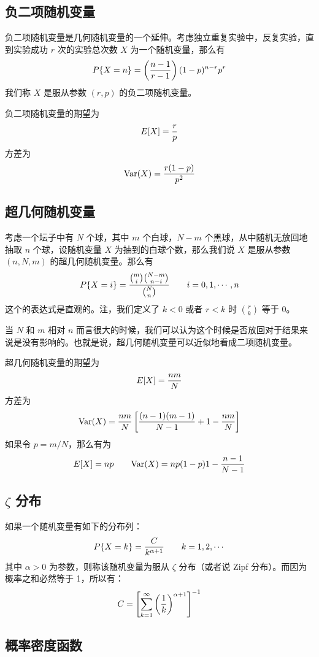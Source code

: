 \documentclass[utf8,a4paper,nofonts,9pt]{ctexbook}
\begin{document}
\subsection{负二项随机变量}

负二项随机变量是几何随机变量的一个延伸。考虑独立重复实验中，反复实验，直到实验成功 $r$ 次的实验总次数 $X$ 为一个随机变量，那么有
\[
    P\{ X = n \} = \left( { n - 1 \over r - 1 } \right) (1 - p)^{n - r} p^r
\]
我们称 $X$ 是服从参数 $(r, p)$ 的负二项随机变量。

负二项随机变量的期望为
\[
    E[X] = {r \over p}
\]
方差为
\[
    \textrm{Var}(X) = {r(1 - p) \over p^2}
\]


\subsection{超几何随机变量}

考虑一个坛子中有 $N$ 个球，其中 $m$ 个白球，$N - m$ 个黑球，从中随机无放回地抽取 $n$ 个球，设随机变量 $X$ 为抽到的白球个数，那么我们说 $X$ 是服从参数 $(n, N, m)$ 的超几何随机变量。那么有
\[
    P\{ X = i \} = {{m \choose i} {N - m \choose n - i} \over {N \choose n}} \qquad i = 0, 1, \cdots, n
\]
这个的表达式是直观的。注，我们定义了 $k < 0$ 或者 $r < k$ 时 $r \choose k$ 等于 $0$。

当 $N$ 和 $m$ 相对 $n$ 而言很大的时候，我们可以认为这个时候是否放回对于结果来说是没有影响的。也就是说，超几何随机变量可以近似地看成二项随机变量。

超几何随机变量的期望为
\[
    E[X] = {nm \over N}
\]
方差为
\[
    \textrm{Var}(X) = {nm \over N}\left[ {(n - 1)(m - 1) \over N - 1} + 1 - {nm \over N} \right]
\]
如果令 $p = m / N$，那么有为
\[
    E[X] = np \qquad \textrm{Var}(X) = np(1 - p){1- {n - 1 \over N - 1}}
\]


\subsection{$\zeta$ 分布}

如果一个随机变量有如下的分布列：
\[
    P\{X = k\} = {C \over k^{\alpha + 1}} \qquad k = 1, 2, \cdots
\]
其中 $\alpha > 0$ 为参数，则称该随机变量为服从 $\zeta$ 分布（或者说 Zipf 分布）。而因为概率之和必然等于 1，所以有：
\[
    C = \left[ \sum_{k = 1}^\infty \left( {1 \over k} \right)^{\alpha + 1} \right]^{-1}
\]


\subsection{概率密度函数}
\end{document}
